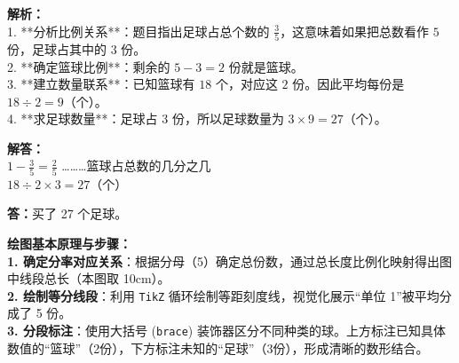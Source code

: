 \documentclass[12pt, a4paper]{ctexrep}
\begin{document}
\begin{center}
\end{center}

\vspace{0.6cm}

{\small\color{gray}
\textbf{解析：}\\
1. **分析比例关系**：题目指出足球占总个数的 $\frac{3}{5}$，这意味着如果把总数看作 $5$ 份，足球占其中的 $3$ 份。\\
2. **确定篮球比例**：剩余的 $5 - 3 = 2$ 份就是篮球。\\
3. **建立数量联系**：已知篮球有 $18$ 个，对应这 $2$ 份。因此平均每份是 $18 \div 2 = 9$（个）。\\
4. **求足球数量**：足球占 $3$ 份，所以足球数量为 $3 \times 9 = 27$（个）。
}

\vspace{0.4cm}
\noindent\textbf{解答：}\\
\indent $1 - \frac{3}{5} = \frac{2}{5}$ \dots\dots\dots 篮球占总数的几分之几\\
\indent $18 \div 2 \times 3 = 27$（个）

\vspace{0.2cm}
\noindent\textbf{答：}买了 27 个足球。

\vspace{0.6cm}

{\small\color{blue!70!black}
\textbf{绘图基本原理与步骤：}\\
\textbf{1. 确定分率对应关系}：根据分母（5）确定总份数，通过总长度比例化映射得出图中线段总长（本图取 10cm）。\\
\textbf{2. 绘制等分线段}：利用 \texttt{TikZ} 循环绘制等距刻度线，视觉化展示“单位 1”被平均分成了 5 份。\\
\textbf{3. 分段标注}：使用大括号 (\texttt{brace}) 装饰器区分不同种类的球。上方标注已知具体数值的“篮球”（2份），下方标注未知的“足球”（3份），形成清晰的数形结合。
}
\end{document}
